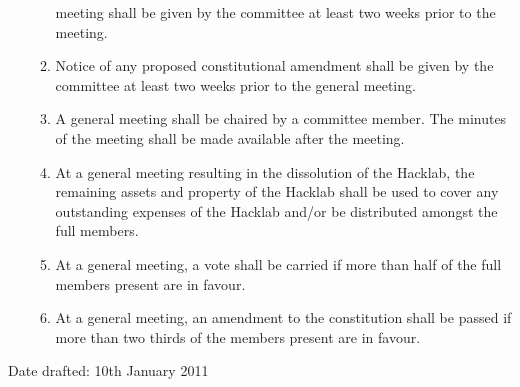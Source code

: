 \documentclass{article}
\begin{document}
\begin{enumerate}
\begin{enumerate}
        meeting shall be given by the committee at least two weeks
        prior to the meeting.
      \item Notice of any proposed constitutional amendment shall be
        given by the committee at least two weeks prior to the general
        meeting.
      \item A general meeting shall be chaired by a committee
        member. The minutes of the meeting shall be made available
        after the meeting.
      \item At a general meeting resulting in the dissolution of the
        Hacklab, the remaining assets and property of the Hacklab
        shall be used to cover any outstanding expenses of the Hacklab
        and/or be distributed amongst the full members.
      \item At a general meeting, a vote shall be carried if more than
        half of the full members present are in favour.
      \item At a general meeting, an amendment to the constitution
        shall be passed if more than two thirds of the members present
        are in favour.
      \end{enumerate}
      
\end{enumerate}
\bigskip
\begin{changebar}
Date drafted: 10th January 2011
\end{changebar}
\end{document}
